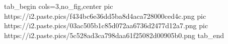  
 
 
 
 

\ifcmt
  tab_begin cols=3,no_fig,center
     pic https://i2.paste.pics/f434bc6e36dd5ba8d4aca728000ced4c.png
		 pic https://i2.paste.pics/03ac505b1c85d072aa6736d2477d12a7.png
		 pic https://i2.paste.pics/5c528ad3ca798daa61f25082d00905b0.png
  tab_end
\fi
